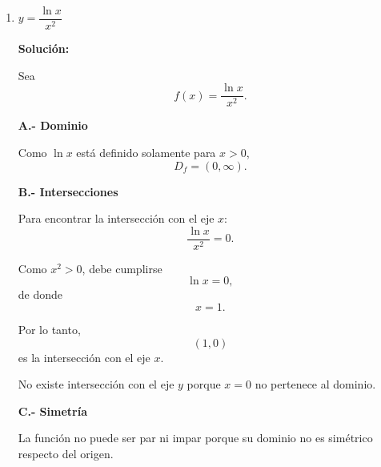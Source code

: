 \documentclass[12pt]{article}
\newcommand{\solucion}{%
    \vspace{0.8em}%
    \textbf{Solución:}%
}
\begin{document}
\begin{enumerate}[label=\alph*.-]
    \begin{center}
    \end{center}


    \vspace{1cm}


    \item $y = \dfrac{\ln x}{x^2}$

    \solucion

    Sea
    \[
    f(x)=\frac{\ln x}{x^2}.
    \]

    \textbf{A.- Dominio}

    Como $\ln x$ está definido solamente para $x>0$,
    \[
    \boxed{D_f=(0,\infty)}.
    \]

    \textbf{B.- Intersecciones}

    Para encontrar la intersección con el eje $x$:
    \[
    \frac{\ln x}{x^2}=0.
    \]

    Como $x^2>0$, debe cumplirse
    \[
    \ln x=0,
    \]
    de donde
    \[
    x=1.
    \]

    Por lo tanto,
    \[
    \boxed{(1,0)}
    \]
    es la intersección con el eje $x$.

    No existe intersección con el eje $y$ porque $x=0$ no pertenece
    al dominio.

				\newpage
    \textbf{C.- Simetría}

    La función no puede ser par ni impar porque su dominio no es
    simétrico respecto del origen.


\end{enumerate}
\end{document}
